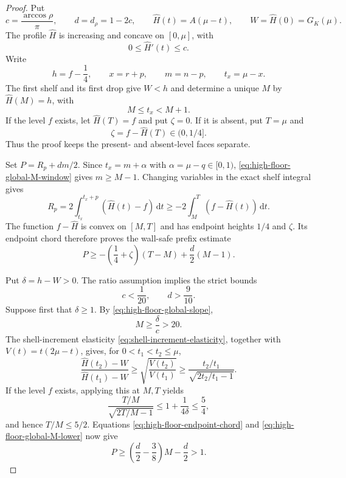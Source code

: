 \documentclass[11pt]{article}
\theoremstyle{remark}
\newcommand{\dd}{\,\mathrm d}
\begin{document}
\begin{proof}
Put
\[
 c=\frac{\arccos\rho}{\pi},\qquad d=d_\rho=1-2c,
 \qquad \widehat H(t)=A(\mu-t),\qquad
 W=\widehat H(0)=G_K(\mu).
\]
The profile $\widehat H$ is increasing and concave on $[0,\mu]$, with
\begin{equation}
 0\leq\widehat H'(t)\leq c.
 \label{eq:high-floor-global-slope}
\end{equation}
Write
\[
 h=f-\frac14,\qquad x=r+p,\qquad m=n-p,
 \qquad t_x=\mu-x.
\]
The first shelf and its first drop give $W<h$ and determine a unique
$M$ by $\widehat H(M)=h$, with
\begin{equation}
 M\leq t_x<M+1.
 \label{eq:high-floor-global-M-window}
\end{equation}
If the level $f$ exists, let $\widehat H(T)=f$ and put $\zeta=0$.
If it is absent, put $T=\mu$ and
\[
 \zeta=f-\widehat H(T)\in(0,1/4].
\]
Thus the proof keeps the present- and absent-level faces separate.

Set $P=R_p+dm/2$.  Since
$t_x=m+\alpha$ with $\alpha=\mu-q\in[0,1)$,
\eqref{eq:high-floor-global-M-window} gives $m\geq M-1$.
Changing variables in the exact shelf integral gives
\[
 R_p=2\int_{t_x}^{t_x+p}(\widehat H(t)-f)\dd t
 \geq-2\int_M^T(f-\widehat H(t))\dd t.
\]
The function $f-\widehat H$ is convex on $[M,T]$ and has endpoint
heights $1/4$ and $\zeta$.  Its endpoint chord therefore proves the
wall-safe prefix estimate
\begin{equation}
 \boxed{
 P\geq-\left(\frac14+\zeta\right)(T-M)
       +\frac d2(M-1).}
 \label{eq:high-floor-endpoint-chord}
\end{equation}

Put $\delta=h-W>0$.  The ratio assumption implies the strict bounds
\begin{equation}
 c<\frac1{20},\qquad d>\frac9{10}.
 \label{eq:high-floor-ratio-constants}
\end{equation}
Suppose first that $\delta\geq1$.  By
\eqref{eq:high-floor-global-slope},
\begin{equation}
 M\geq\frac\delta c>20.
 \label{eq:high-floor-global-M-lower}
\end{equation}
The shell-increment elasticity
\eqref{eq:shell-increment-elasticity}, together with
$V(t)=t(2\mu-t)$, gives, for $0<t_1<t_2\leq\mu$,
\begin{equation}
 \frac{\widehat H(t_2)-W}{\widehat H(t_1)-W}
 \geq\sqrt{\frac{V(t_2)}{V(t_1)}}
 \geq\frac{t_2/t_1}{\sqrt{2t_2/t_1-1}}.
 \label{eq:high-floor-global-elasticity}
\end{equation}
If the level $f$ exists, applying this at $M,T$ yields
\[
 \frac{T/M}{\sqrt{2T/M-1}}
 \leq1+\frac1{4\delta}\leq\frac54,
\]
and hence $T/M\leq5/2$.  Equations
\eqref{eq:high-floor-endpoint-chord} and
\eqref{eq:high-floor-global-M-lower} now give
\begin{equation}
 P\geq\left(\frac d2-\frac38\right)M-\frac d2>1.
 \label{eq:high-floor-present-level-margin}
\end{equation}


\end{proof}
\end{document}
